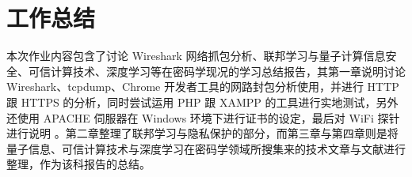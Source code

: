 \chapter{工作总结}
\label{chap:5}

本次作业内容包含了讨论 Wireshark 网络抓包分析、联邦学习与量子计算信息安全、可信计算技术、深度学习等在密码学现况的学习总结报告，其第一章说明讨论 Wireshark、tcpdump、Chrome 开发者工具的网路封包分析使用，并进行 HTTP 跟 HTTPS 的分析，同时尝试运用 PHP 跟 XAMPP 的工具进行实地测试，另外还使用 APACHE 伺服器在 Windows 环境下进行证书的设定，最后对 WiFi 探针进行说明 。第二章整理了联邦学习与隐私保护的部分，而第三章与第四章则是将量子信息、可信计算技术与深度学习在密码学领域所搜集来的技术文章与文献进行整理，作为该科报告的总结。